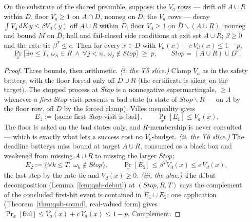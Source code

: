 \begin{bprop}\label{prop:qutb-firsthit}
On the substrate of the shared preamble, suppose: the $V_a$ rows ---
drift off $A \cup R$ within $D$, floor $V_a \ge 1$ on $A \cap \bar{D}$,
nonneg on $\bar{D}$; the $V_d$ rows --- decay
$\int V_d\,dK\,y \le \beta V_d(y)$ off $A \cup R$ within $D$, floor
$V_d \ge 1$ on $\bar{D} \smallsetminus (A \cup R)$, nonneg and bound $M$
on $\bar{D}$; hull and fail-closed side conditions at exit set
$A \cup R$; $\beta \ge 0$ and the rate tie $\beta^{T} \le c$. Then for
every $x \in D$ with $V_a(x) + c\, V_d(x) \le 1 - p$,
\[
\Pr_x\bigl[\exists n \le T,\ \omega_n \in R \ \wedge\
\forall j < n,\ \omega_j \notin \mathit{Stop}\bigr] \;\ge\; p,
\qquad \mathit{Stop} = (A \cup R) \cup D^{\mathrm{c}} .
\]
\end{bprop}
\begin{proof}
Three bounds, then arithmetic.
\emph{(i, the T5 slice.)} Clamp $V_a$ as in the safety battery, with the
floor forced only off $D \cup R$ (the certificate is silent on the
target). The stopped process at $\mathit{Stop}$ is a nonnegative
supermartingale, $\ge 1$ whenever a \emph{first} $\mathit{Stop}$-visit
presents a bad state (a state of
$\mathit{Stop} \smallsetminus R$ --- on $A$ by the floor row, off $D$ by
the forced clamp); Ville\textquotesingle s inequality gives
\[
E_1 := \bigl\{\text{some first } \mathit{Stop}\text{-visit is bad}\bigr\},
\qquad \Pr_x[E_1] \le V_a(x).
\]
The floor is asked on the bad states only, and $R$-membership is never
consulted --- which is exactly what lets a success cost no $V_a$-budget.
\emph{(ii, the T6 slice.)} The deadline battery\textquotesingle s miss
bound at target $A \cup R$, consumed as a black box and weakened from
missing $A \cup R$ to missing the larger $\mathit{Stop}$:
\[
E_2 := \bigl\{\forall k \le T,\ \omega_k \notin \mathit{Stop}\bigr\},
\qquad \Pr_x[E_2] \le \beta^{T} V_d(x) \le c\, V_d(x),
\]
the last step by the rate tie and $V_d(x) \ge 0$.
\emph{(iii, the glue.)} The d\'ebut decomposition
(Lemma~\ref{lem:qub-debut}) at $(\mathit{Stop}, R, T)$ says the
complement of the concluded first-hit event is contained in
$E_1 \cup E_2$; one  application
(Theorem~\ref{thm:qub-sound}, real-valued form) gives
$\Pr_x[\text{fail}] \le V_a(x) + c\,V_d(x) \le 1 - p$. Complement.
\end{proof}

